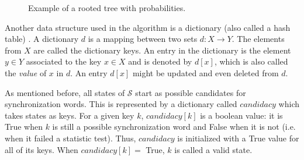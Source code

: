 {\begin{figure}
\centering
{}
\caption{Example of a rooted tree with probabilities. \label{fig:rtp}}
\end{figure}
 
 Another data structure used in the algorithm is a dictionary (also called a hash table) \citep{thomas2001introduction}. A dictionary $d$ is a mapping between two sets $d: X \rightarrow Y$. The elements from $X$ are called the dictionary keys. An entry in the dictionary is the element $y \in Y$ associated to the key $x \in X$ and is denoted by $d[x]$, which is also called the \textit{value} of $x$ in $d$. An entry $d[x]$ might be updated and even deleted from $d$.
 
As mentioned before, all states of $\mathcal{S}$ start as possible candidates for synchronization words. This is represented by a dictionary called $candidacy$ which takes states as keys. For a given key $k$, $candidacy[k]$ is a boolean value: it is True when $k$ is still a possible synchronization word and False when it is not (i.e. when it failed a statistic test). Thus, $candidacy$ is initialized with a True value for all of its keys. When $candidacy[k] =$ True, $k$ is called a valid state.
 
}

